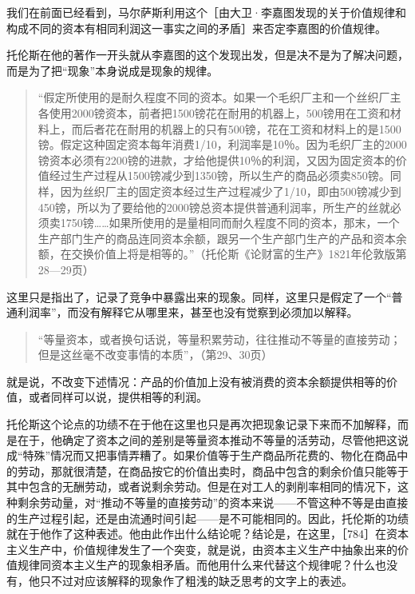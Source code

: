 
我们在前面已经看到，马尔萨斯利用这个［由大卫·李嘉图发现的关于价值规律和构成不同的资本有相同利润这一事实之间的矛盾］来否定李嘉图的价值规律。

托伦斯在他的著作一开头就从李嘉图的这个发现出发，但是决不是为了解决问题，而是为了把“现象”本身说成是现象的规律。

\begin{quote}{“假定所使用的是耐久程度不同的资本。如果一个毛织厂主和一个丝织厂主各使用2000镑资本，前者把1500镑花在耐用的机器上，500镑用在工资和材料上，而后者花在耐用的机器上的只有500镑，花在工资和材料上的是1500镑。假定这种固定资本每年消费1/10，利润率是10％。因为毛织厂主的2000镑资本必须有2200镑的进款，才给他提供10％的利润，又因为固定资本的价值经过生产过程从1500镑减少到1350镑，所以生产的商品必须卖850镑。同样，因为丝织厂主的固定资本经过生产过程减少了1/10，即由500镑减少到450镑，所以为了要给他的2000镑总资本提供普通利润率，所生产的丝就必须卖1750镑……如果所使用的是量相同而耐久程度不同的资本，那末，一个生产部门生产的商品连同资本余额，跟另一个生产部门生产的产品和资本余额，在交换价值上将是相等的。”（托伦斯《论财富的生产》1821年伦敦版第28—29页）}\end{quote}

这里只是指出了，记录了竞争中暴露出来的现象。同样，这里只是假定了一个“普通利润率”，而没有解释它从哪里来，甚至也没有觉察到必须加以解释。

\begin{quote}{“等量资本，或者换句话说，等量积累劳动，往往推动不等量的直接劳动；但是这丝毫不改变事情的本质”，（第29、30页）}\end{quote}

就是说，不改变下述情况：产品的价值加上没有被消费的资本余额提供相等的价值，或者同样可以说，提供相等的利润。

托伦斯这个论点的功绩不在于他在这里也只是再次把现象记录下来而不加解释，而是在于，他确定了资本之间的差别是等量资本推动不等量的活劳动，尽管他把这说成“特殊”情况而又把事情弄糟了。如果价值等于生产商品所花费的、物化在商品中的劳动，那就很清楚，在商品按它的价值出卖时，商品中包含的剩余价值只能等于其中包含的无酬劳动，或者说剩余劳动。但是在对工人的剥削率相同的情况下，这种剩余劳动量，对“推动不等量的直接劳动”的资本来说——不管这种不等是由直接的生产过程引起，还是由流通时间引起——是不可能相同的。因此，托伦斯的功绩就在于他作了这种表述。他由此作出什么结论呢？结论是，在这里，［784］在资本主义生产中，价值规律发生了一个突变，就是说，由资本主义生产中抽象出来的价值规律同资本主义生产的现象相矛盾。而他用什么来代替这个规律呢？什么也没有，他只不过对应该解释的现象作了粗浅的缺乏思考的文字上的表述。

